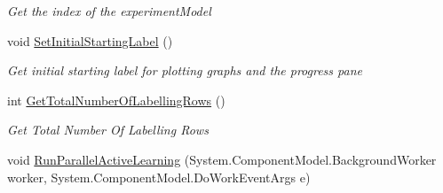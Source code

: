 \begin{DoxyCompactItemize}
\begin{DoxyCompactList}\small\item\em Get the index of the experiment\+Model \end{DoxyCompactList}\item 
void \hyperlink{class_acrive_crowd_g_u_i_1_1_experiment_setting_a71aef9095b75b5f23a47321515a7dd20}{Set\+Initial\+Starting\+Label} ()
\begin{DoxyCompactList}\small\item\em Get initial starting label for plotting graphs and the progress pane \end{DoxyCompactList}\item 
int \hyperlink{class_acrive_crowd_g_u_i_1_1_experiment_setting_a8e9f8cefeabc1a187bff38699083c854}{Get\+Total\+Number\+Of\+Labelling\+Rows} ()
\begin{DoxyCompactList}\small\item\em Get Total Number Of Labelling Rows \end{DoxyCompactList}\item 
\hypertarget{class_acrive_crowd_g_u_i_1_1_experiment_setting_a0c91411666fa2968bbcdcdbe655d1c51}{}void \hyperlink{class_acrive_crowd_g_u_i_1_1_experiment_setting_a0c91411666fa2968bbcdcdbe655d1c51}{Run\+Parallel\+Active\+Learning} (System.\+Component\+Model.\+Background\+Worker worker, System.\+Component\+Model.\+Do\+Work\+Event\+Args e)\label{class_acrive_crowd_g_u_i_1_1_experiment_setting_a0c91411666fa2968bbcdcdbe655d1c51}


\end{DoxyCompactItemize}
